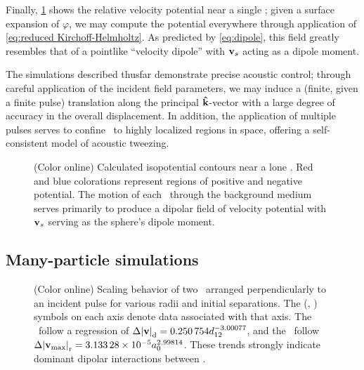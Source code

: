 Finally, \cref{fig:dipole field} shows the relative velocity potential near a single \bubble; given a surface expansion of $\varphi$, we may compute the potential everywhere through application of \cref{eq:reduced Kirchoff-Helmholtz}.
As predicted by \cref{eq:dipole}, this field greatly resembles that of a
pointlike ``velocity dipole'' with $\vb{v}_s$ acting as a dipole moment.

The simulations described thusfar demonstrate precise acoustic control; through careful application of the incident field parameters, we may induce a (finite, given a finite pulse) translation along the principal $\vu{k}$-vector with a large degree of accuracy in the overall displacement.
In addition, the application of multiple pulses serves to confine \bubbles\ to highly localized regions in space, offering a self-consistent model of acoustic tweezing.


\begin{figure}
  \centering
  
  \caption{
    \label{fig:dipole field}(Color online)
    Calculated isopotential contours near a lone \bubble.
    Red and blue colorations represent regions of positive and negative potential.
    The motion of each \bubble\ through the background medium serves primarily to produce a dipolar field of velocity potential with $\vb{v}_s$ serving as the sphere's dipole moment.
  }
\end{figure}

\subsection{Many-particle simulations}

\begin{figure}
  \centering
  
  \caption{
    \label{fig:double scaling}(Color online)
    Scaling behavior of two \bubbles\ arranged perpendicularly to an incident pulse for various radii and initial separations.
    The (\redTriangle, \blueCircle) symbols on each axis denote data associated with that axis.
    The \redTriangle\ follow a regression of $\Delta \abs{\vb{v}}_\text{d} = \num{0.250754} d_{12}^{-3.00077}$, and the \blueCircle\ follow $\Delta\abs{\vb{v}_\text{max}}_\text{r} = \num{3.13328e-5} a_0^{2.99814}$.
    These trends strongly indicate dominant dipolar interactions between \bubbles.
  }
\end{figure}

